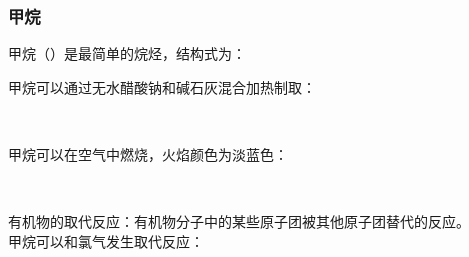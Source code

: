 \documentclass[UTF8]{ctexart}
\begin{document}
\subsubsection{甲烷}
    甲烷（）是最简单的烷烃，结构式为：\vspace{5pt}
    \begin{center}
    \end{center}\vspace{10pt}
    甲烷可以通过无水醋酸钠和碱石灰混合加热制取：
    \begin{center}
        \\[3mm]
    \end{center}
    甲烷可以在空气中燃烧，火焰颜色为淡蓝色：
    \begin{center}
        \\[4mm]
    \end{center}
    有机物的取代反应：有机物分子中的某些原子团被其他原子团替代的反应。\\[3mm]
    甲烷可以和氯气发生取代反应：\vspace{15pt}
\end{document}
